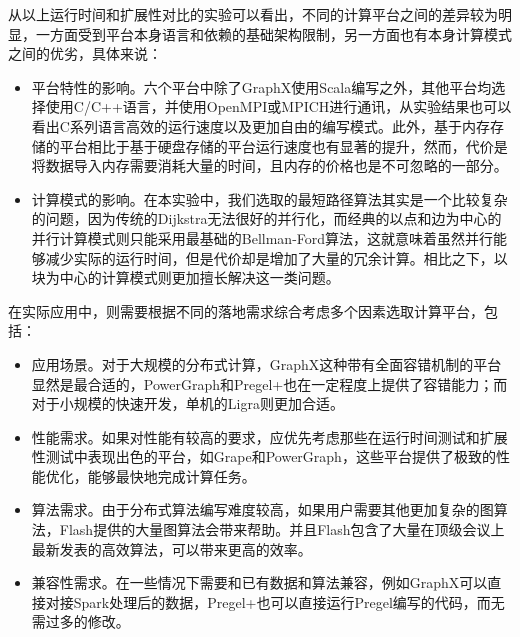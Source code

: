 从以上运行时间和扩展性对比的实验可以看出，不同的计算平台之间的差异较为明显，一方面受到平台本身语言和依赖的基础架构限制，另一方面也有本身计算模式之间的优劣，具体来说：
\begin{itemize}
    \item 平台特性的影响。六个平台中除了GraphX使用Scala编写之外，其他平台均选择使用C/C++语言，并使用OpenMPI或MPICH进行通讯，从实验结果也可以看出C系列语言高效的运行速度以及更加自由的编写模式。此外，基于内存存储的平台相比于基于硬盘存储的平台运行速度也有显著的提升，然而，代价是将数据导入内存需要消耗大量的时间，且内存的价格也是不可忽略的一部分。
    \item 计算模式的影响。在本实验中，我们选取的最短路径算法其实是一个比较复杂的问题，因为传统的Dijkstra无法很好的并行化，而经典的以点和边为中心的并行计算模式则只能采用最基础的Bellman-Ford算法，这就意味着虽然并行能够减少实际的运行时间，但是代价却是增加了大量的冗余计算。相比之下，以块为中心的计算模式则更加擅长解决这一类问题。
\end{itemize}
在实际应用中，则需要根据不同的落地需求综合考虑多个因素选取计算平台，包括：
\begin{itemize}
    \item 应用场景。对于大规模的分布式计算，GraphX这种带有全面容错机制的平台显然是最合适的，PowerGraph和Pregel+也在一定程度上提供了容错能力；而对于小规模的快速开发，单机的Ligra则更加合适。
    \item 性能需求。如果对性能有较高的要求，应优先考虑那些在运行时间测试和扩展性测试中表现出色的平台，如Grape和PowerGraph，这些平台提供了极致的性能优化，能够最快地完成计算任务。
    \item 算法需求。由于分布式算法编写难度较高，如果用户需要其他更加复杂的图算法，Flash提供的大量图算法会带来帮助。并且Flash包含了大量在顶级会议上最新发表的高效算法，可以带来更高的效率。
    \item 兼容性需求。在一些情况下需要和已有数据和算法兼容，例如GraphX可以直接对接Spark处理后的数据，Pregel+也可以直接运行Pregel编写的代码，而无需过多的修改。
\end{itemize}